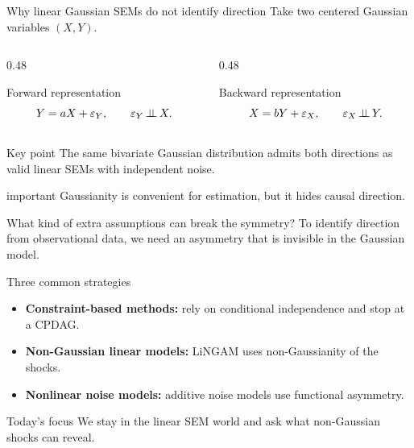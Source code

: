 \documentclass[dvipsnames,aspectratio=169,handout]{beamer}
\begin{document}
\begin{frame}{Why linear Gaussian SEMs do not identify direction}
Take two centered Gaussian variables $(X,Y)$.

\begin{columns}[T]
\begin{column}{0.48\textwidth}
\begin{block}{Forward representation}
\[
Y = aX + \varepsilon_Y,
\qquad
\varepsilon_Y \mbox{\,$\perp\!\!\!\perp$\,} X.
\]
\end{block}
\end{column}
\begin{column}{0.48\textwidth}
\begin{block}{Backward representation}
\[
X = bY + \varepsilon_X,
\qquad
\varepsilon_X \mbox{\,$\perp\!\!\!\perp$\,} Y.
\]
\end{block}
\end{column}
\end{columns}

\begin{alertblock}{Key point}
The same bivariate Gaussian distribution admits both directions as valid linear SEMs with independent noise.
\end{alertblock}

\begin{beamercolorbox}[wd=\textwidth,sep=7pt,center,rounded=true,shadow=true]{important}
Gaussianity is convenient for estimation, but it hides causal direction.
\end{beamercolorbox}
\end{frame}

\begin{frame}{What kind of extra assumptions can break the symmetry?}
To identify direction from observational data, we need an asymmetry that is invisible in the Gaussian model.

\begin{block}{Three common strategies}
\begin{itemize}
    \item \textbf{Constraint-based methods:} rely on conditional independence and stop at a CPDAG.
    \item \textbf{Non-Gaussian linear models:} LiNGAM uses non-Gaussianity of the shocks.
    \item \textbf{Nonlinear noise models:} additive noise models use functional asymmetry.
\end{itemize}
\end{block}

\begin{alertblock}{Today's focus}
We stay in the linear SEM world and ask what non-Gaussian shocks can reveal.
\end{alertblock}
\end{frame}
\end{document}
